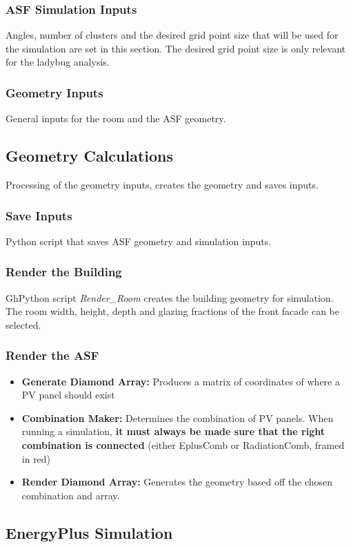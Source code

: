 	\subsubsection{ASF Simulation Inputs}
	Angles, number of clusters and the desired grid point size that will be used for the simulation are set in this section. The desired grid point size is only relevant for the ladybug analysis.

	\subsubsection{Geometry Inputs}
	General inputs for the room and the ASF geometry. 

	\subsection{Geometry Calculations}
	Processing of the geometry inputs, creates the geometry and saves inputs.
	\subsubsection{Save Inputs}
	Python script that saves ASF geometry and simulation inputs.

	\subsubsection{Render the Building}
	GhPython script \emph{Render\_Room} creates the building geometry for simulation. The room width, height, depth and glazing fractions of the front facade can be selected.

	\subsubsection{Render the ASF}
	\begin{itemize}
	\item{{\bf Generate Diamond Array:} Produces a matrix of coordinates of where a PV panel should exist}
	\item{{\bf Combination Maker:} Determines the combination of PV panels. When running a simulation, {\bf it must always be made sure that the right combination is connected} (either EplusComb or RadiationComb, framed in red)}
	\item{{\bf Render Diamond Array:} Generates the geometry based off the chosen combination and array.}
	\end{itemize}

	\subsection{EnergyPlus Simulation}

